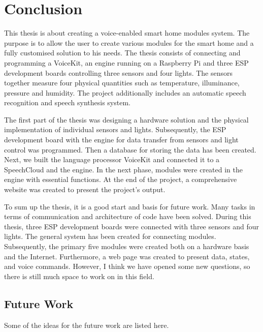 \chapter{Conclusion} \label{chap:conclusion}
This thesis is about creating a voice-enabled smart home modules system. The purpose is to allow the user to create various modules for the smart home and a fully customised solution to his needs. The thesis consists of connecting and programming a VoiceKit, an engine running on a Raspberry Pi and three ESP development boards controlling three sensors and four lights. The sensors together measure four physical quantities such as temperature, illuminance, pressure and humidity. The project additionally includes an automatic speech recognition and speech synthesis system. 

The first part of the thesis was designing a hardware solution and the physical implementation of individual sensors and lights. Subsequently, the ESP development board with the engine for data transfer from sensors and light control was programmed. Then a database for storing the data has been created. Next, we built the language processor VoiceKit and connected it to a SpeechCloud and the engine. In the next phase, modules were created in the engine with essential functions. At the end of the project, a comprehensive website was created to present the project's output. 

To sum up the thesis, it is a good start and basis for future work. Many tasks in terms of communication and architecture of code have been solved. During this thesis, three ESP development boards were connected with three sensors and four lights. The general system has been created for connecting modules. Subsequently, the primary five modules were created both on a hardware basis and the Internet. Furthermore, a web page was created to present data, states, and voice commands. However, I think we have opened some new questions, so there is still much space to work on in this field. 

\section{Future Work} \label{sec:future_work}
Some of the ideas for the future work are listed here.

